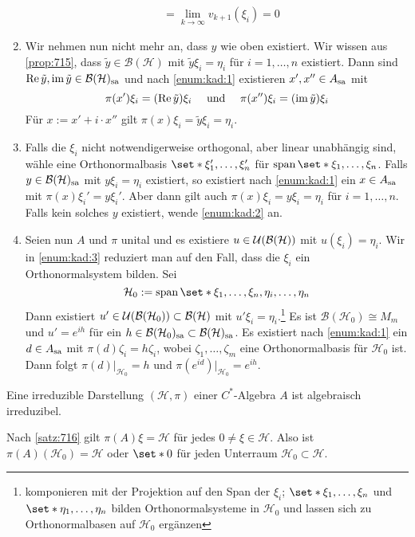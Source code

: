 \begin{beweis}
\begin{enumerate}[label={Teil \Roman*.},wide,font=\bfseries\scshape]
\begin{align}
			&= \lim_{k  \to \infty} v_{k+1}(\xi_i) =0
		\end{align}
		\item \label{enum:kad:2} Wir nehmen nun nicht mehr an, dass $y$ wie oben existiert.
		Wir wissen aus \autoref{prop:715}, dass $\tilde{y} \in \mathcal{B}(\mathcal{H})$ mit $\tilde{y} \xi_i = \eta_i$ für $i=1,\ldots ,n$ existiert.
		Dann sind $\operatorname{Re} \tilde{y}, \operatorname{im} \tilde{y} \in \mathcal{B}(\mathcal{H})_{\mathrm{sa}}$ und nach \ref{enum:kad:1} existieren $x',x'' \in A_{\mathrm{sa}}$ mit 
		\[
			\pi(x') \xi_i = \enbrace*{\re \tilde{y}} \xi_i \quad \text{ und } \quad \pi(x'') \xi_i = (\im \tilde{y})\xi_i 
		\]
		Für $x := x' + i \cdot x''$ gilt $\pi(x) \xi_i = \tilde{y}\xi_i = \eta_i$.
		\item \label{enum:kad:3}Falls die $\xi_i$ nicht notwendigerweise orthogonal, aber linear unabhängig sind, wähle eine Orthonormalbasis $\set*{\xi_1', \ldots , \xi_n'}$ für $\Span \set*{\xi_1, \ldots ,\xi_n}$.
		Falls $y \in \mathcal{B}(\mathcal{H})_{\mathrm{sa}}$ mit $y \xi_i = \eta_i$ existiert, so existiert nach \ref{enum:kad:1} ein $x \in A_{\mathrm{sa}}$ mit $\pi(x)\xi_i' = y \xi_i'$.
		Aber dann gilt auch $\pi(x)\xi_i = y \xi_i = \eta_i$ für $i=1,\ldots ,n$.
		Falls kein solches $y$ existiert, wende \ref{enum:kad:2} an.
		\item \label{enum:kad:4} Seien nun $A$ und $\pi$ unital und es existiere $u \in \mathcal{U}\enbrace*{\mathcal{B}(\mathcal{H})}$ mit $u(\xi_i)=\eta_i$.
		Wir in \ref{enum:kad:3} reduziert man auf den Fall, dass die $\xi_i$ ein Orthonormalsystem bilden.
		Sei 
		\[
			\mathcal{H}_0 := \Span \set*{\xi_1, \ldots, \xi_n, \eta_i, \ldots ,\eta_n}
		\]
		Dann existiert $u' \in \mathcal{U}\enbrace*{\mathcal{B}(\mathcal{H}_0)} \subset \mathcal{B}(\mathcal{H})$ mit $u' \xi_i = \eta_i$.\footnote{komponieren mit der Projektion auf den Span der $\xi_i$; $\set*{\xi_1, \ldots ,\xi_n}$ und $\set*{\eta_1,\ldots ,\eta_n}$ bilden Orthonormalsysteme in $\mathcal{H}_0$ und lassen sich zu Orthonormalbasen auf $\mathcal{H}_0$ ergänzen}
		Es ist $\mathcal{B}(\mathcal{H}_0) \cong M_m$ und $u' = e^{i h}$ für ein $h \in \mathcal{B}(\mathcal{H}_0)_{\mathrm{sa}} \subset \mathcal{B}(\mathcal{H})_{\mathrm{sa}}$.
		Es existiert nach \ref{enum:kad:1} ein $d \in A_{\mathrm{sa}}$ mit $\pi(d) \zeta_i = h \zeta_i$, wobei $\zeta_1,\ldots , \zeta_m$ eine Orthonormalbasis für $\mathcal{H}_0$ ist.
		Dann folgt $\pi(d)|_{\mathcal{H}_0}=h$ und $\pi(e^{id})|_{\mathcal{H}_0}= e^{ih}$.\qedhere
	\end{enumerate}
\end{beweis}

\begin{korollar}[{name=[irreduzibel impliziert algebraisch irreduzibel]},label=korr:717]
	Eine irreduzible Darstellung $(\mathcal{H},\pi)$ einer $C^*$-Algebra $A$ ist algebraisch irreduzibel.
\end{korollar}
\begin{beweis}
	Nach \autoref{satz:716} gilt $\pi(A)\xi=\mathcal{H}$ für jedes $0 \neq \xi \in \mathcal{H}$.
	Also ist $\pi(A)(\mathcal{H}_0)=\mathcal{H}$ oder $\set*{0}$ für jeden Unterraum $\mathcal{H}_0 \subset \mathcal{H}$.
\end{beweis}

